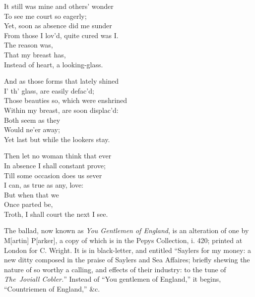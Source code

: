 \settowidth{\versewidth}{Those beauties so, which were ensh}
\begin{dcverse}
\begin{patverse}
It still was mine and others’ wonder\\
To see me court so eagerly;\\
Yet, soon as absence did me sunder\\
From those I lov’d, quite cured was I.\\
The reason was,\\
That my breast has,\\
Instead of heart, a looking-glass.
\end{patverse}

\begin{patverse}
And as those forms that lately shined\\
I’ th’ glass, are easily defac’d;\\
Those beauties so, which were enshrined\\
Within my breast, are soon displac’d:\\
Both seem as they\\
Would ne’er away;\\
Yet last but while the lookers stay.
\end{patverse}

\begin{patverse}
Then let no woman think that ever\\
In absence I shall constant prove;\\
Till some occasion does us sever\\
I can, as true as any, love:\\
But when that we\\
Once parted be,\\
Troth, I shall court the next I see.
\end{patverse}
\end{dcverse}


The ballad, now known as \textit{You Gentlemen of England}, is an alteration of one
by M[artin] P[arker], a copy of which is in the Pepys Collection, i. 420; printed
at London for C. Wright. It is in black-letter, and entitled “Saylers for my
money: a new ditty composed in the praise of Saylers and Sea Affaires; briefly
shewing the nature of so worthy a calling, \pagebreak and effects of their industry: to the
tune of \textit{The~Joviall Cobler.}” Instead of “You gentlemen of England,” it begins,
“Countriemen of England,” \&c.

